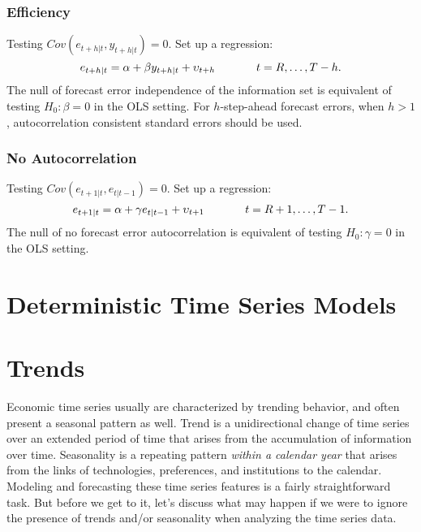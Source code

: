 \documentclass[
  oneside]{book}
\begin{document}
\hypertarget{efficiency}{%
\subsection{Efficiency}\label{efficiency}}

Testing \(Cov(e_{t+h|t},y_{t+h|t})=0\). Set up a regression: \[e_{t+h|t} = \alpha + \beta y_{t+h|t} + \upsilon_{t+h} \hspace{.5in} t = R,\ldots,T-h.\] The null of forecast error independence of the information set is equivalent of testing \(H_0: \beta = 0\) in the OLS setting. For \(h\)-step-ahead forecast errors, when \(h>1\), autocorrelation consistent standard errors should be used.

\hypertarget{no-autocorrelation}{%
\subsection{No Autocorrelation}\label{no-autocorrelation}}

Testing \(Cov(e_{t+1|t},e_{t|t-1})=0\). Set up a regression: \[e_{t+1|t} = \alpha + \gamma e_{t|t-1} + \upsilon_{t+1} \hspace{.5in} t = R+1,\ldots,T-1.\] The null of no forecast error autocorrelation is equivalent of testing \(H_0: \gamma = 0\) in the OLS setting.

\hypertarget{deterministic-time-series-models}{%
\chapter*{Deterministic Time Series Models}\label{deterministic-time-series-models}}

\hypertarget{trends}{%
\chapter{Trends}\label{trends}}

Economic time series usually are characterized by trending behavior, and often present a seasonal pattern as well. Trend is a unidirectional change of time series over an extended period of time that arises from the accumulation of information over time. Seasonality is a repeating pattern \emph{within a calendar year} that arises from the links of technologies, preferences, and institutions to the calendar. Modeling and forecasting these time series features is a fairly straightforward task. But before we get to it, let's discuss what may happen if we were to ignore the presence of trends and/or seasonality when analyzing the time series data.
\end{document}
